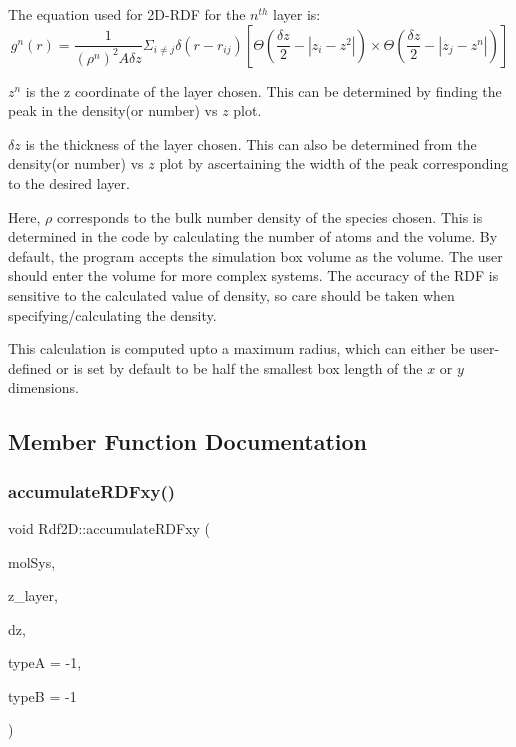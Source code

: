 The equation used for 2D-\/\+R\+DF for the $n^{th}$ layer is\+: \[ g^n(r) = \frac{1}{(\rho^n)^2 A \delta z} \Sigma_{i \neq j} \delta(r - r_{ij}) \left[ \Theta\left( \frac{\delta z}{2}-|z_i-z^2| \right) \times \Theta\left( \frac{\delta z}{2}-|z_j-z^n| \right) \right] \]
\begin{DoxyItemize}
\item $z^n$ is the z coordinate of the layer chosen. This can be determined by finding the peak in the density(or number) vs $z$ plot.
\item $\delta z$ is the thickness of the layer chosen. This can also be determined from the density(or number) vs $z$ plot by ascertaining the width of the peak corresponding to the desired layer.
\item Here, $\rho$ corresponds to the bulk number density of the species chosen. This is determined in the code by calculating the number of atoms and the volume. By default, the program accepts the simulation box volume as the volume. The user should enter the volume for more complex systems. The accuracy of the R\+DF is sensitive to the calculated value of density, so care should be taken when specifying/calculating the density.
\item This calculation is computed upto a maximum radius, which can either be user-\/defined or is set by default to be half the smallest box length of the $x$ or $y$ dimensions. 
\end{DoxyItemize}

\subsection{Member Function Documentation}
\mbox{\label{classRdf2D_a6c716851d80fd2a7dcfefd219892d87b}} 
\subsubsection{\texorpdfstring{accumulate\+R\+D\+Fxy()}{accumulateRDFxy()}}
{\footnotesize\ttfamily void Rdf2\+D\+::accumulate\+R\+D\+Fxy (\begin{DoxyParamCaption}\item[{class \mbox{\hyperlink{classCMolecularSystem}{C\+Molecular\+System}} \&}]{mol\+Sys,  }\item[{double}]{z\+\_\+layer,  }\item[{double}]{dz,  }\item[{int}]{typeA = {\ttfamily -\/1},  }\item[{int}]{typeB = {\ttfamily -\/1} }\end{DoxyParamCaption})}

